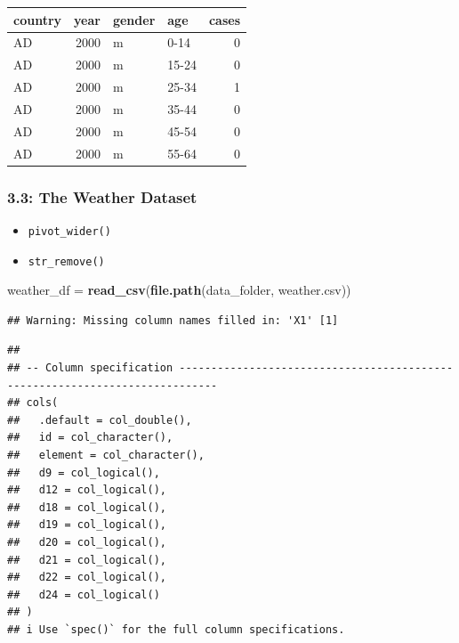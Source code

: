 \documentclass[
]{article}
\newenvironment{Shaded}{\begin{snugshade}}{\end{snugshade}}
\newcommand{\KeywordTok}[1]{\textcolor[rgb]{0.13,0.29,0.53}{\textbf{#1}}}
\newcommand{\NormalTok}[1]{#1}
\newcommand{\StringTok}[1]{\textcolor[rgb]{0.31,0.60,0.02}{#1}}
\providecommand{\tightlist}{%
  \setlength{\itemsep}{0pt}\setlength{\parskip}{0pt}}
\begin{document}
\begin{tabular}{l|r|l|l|r}
\hline
country & year & gender & age & cases\\
\hline
AD & 2000 & m & 0-14 & 0\\
\hline
AD & 2000 & m & 15-24 & 0\\
\hline
AD & 2000 & m & 25-34 & 1\\
\hline
AD & 2000 & m & 35-44 & 0\\
\hline
AD & 2000 & m & 45-54 & 0\\
\hline
AD & 2000 & m & 55-64 & 0\\
\hline
\end{tabular}

\hypertarget{the-weather-dataset}{%
\subsubsection{3.3: The Weather Dataset}\label{the-weather-dataset}}

\begin{itemize}
\tightlist
\item
  \texttt{pivot\_wider()}
\item
  \texttt{str\_remove()}
\end{itemize}

\begin{Shaded}
\begin{Highlighting}[]
\NormalTok{weather\_df =}\StringTok{ }\KeywordTok{read\_csv}\NormalTok{(}\KeywordTok{file.path}\NormalTok{(data\_folder, }\StringTok{\textquotesingle{}weather.csv\textquotesingle{}}\NormalTok{))}
\end{Highlighting}
\end{Shaded}

\begin{verbatim}
## Warning: Missing column names filled in: 'X1' [1]
\end{verbatim}

\begin{verbatim}
## 
## -- Column specification ----------------------------------------------------------------------------
## cols(
##   .default = col_double(),
##   id = col_character(),
##   element = col_character(),
##   d9 = col_logical(),
##   d12 = col_logical(),
##   d18 = col_logical(),
##   d19 = col_logical(),
##   d20 = col_logical(),
##   d21 = col_logical(),
##   d22 = col_logical(),
##   d24 = col_logical()
## )
## i Use `spec()` for the full column specifications.
\end{verbatim}
\end{document}
